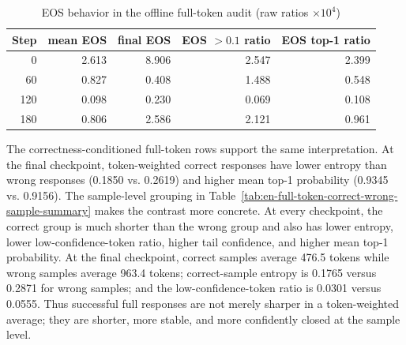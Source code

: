 \begin{table}[H]
    \centering
    \caption{EOS behavior in the offline full-token audit (raw ratios $\times 10^4$)}
    \label{tab:en-full-token-eos-summary}
    \small
    \setlength{\tabcolsep}{5pt}
    \begin{tabular}{rrrrr}
        \toprule
        Step & mean EOS & final EOS & EOS $>0.1$ ratio & EOS top-1 ratio \\
        \midrule
        0 & 2.613 & 8.906 & 2.547 & 2.399 \\
        60 & 0.827 & 0.408 & 1.488 & 0.548 \\
        120 & 0.098 & 0.230 & 0.069 & 0.108 \\
        180 & 0.806 & 2.586 & 2.121 & 0.961 \\
        \bottomrule
    \end{tabular}
\end{table}

The correctness-conditioned full-token rows support the same interpretation. At the final checkpoint, token-weighted correct responses have lower entropy than wrong responses (0.1850 vs. 0.2619) and higher mean top-1 probability (0.9345 vs. 0.9156). The sample-level grouping in Table~\ref{tab:en-full-token-correct-wrong-sample-summary} makes the contrast more concrete. At every checkpoint, the correct group is much shorter than the wrong group and also has lower entropy, lower low-confidence-token ratio, higher tail confidence, and higher mean top-1 probability. At the final checkpoint, correct samples average 476.5 tokens while wrong samples average 963.4 tokens; correct-sample entropy is 0.1765 versus 0.2871 for wrong samples; and the low-confidence-token ratio is 0.0301 versus 0.0555. Thus successful full responses are not merely sharper in a token-weighted average; they are shorter, more stable, and more confidently closed at the sample level.

